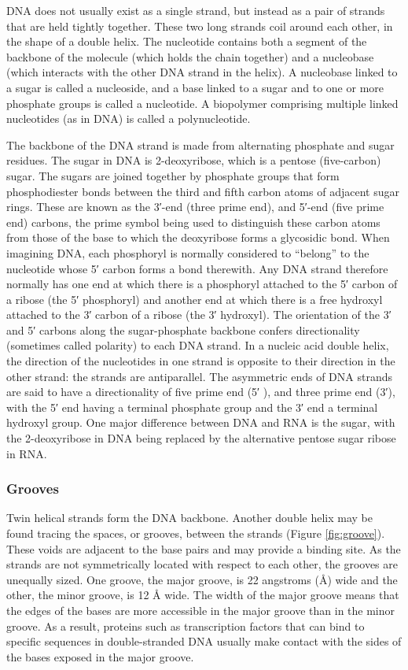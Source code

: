 DNA does not usually exist as a single strand, but instead as a pair of strands that are held tightly together. These two long strands coil around each other, in the shape of a double helix. The nucleotide contains both a segment of the backbone of the molecule (which holds the chain together) and a nucleobase (which interacts with the other DNA strand in the helix). A nucleobase linked to a sugar is called a nucleoside, and a base linked to a sugar and to one or more phosphate groups is called a nucleotide. A biopolymer comprising multiple linked nucleotides (as in DNA) is called a polynucleotide.

The backbone of the DNA strand is made from alternating phosphate and sugar residues. The sugar in DNA is 2-deoxyribose, which is a pentose (five-carbon) sugar. The sugars are joined together by phosphate groups that form phosphodiester bonds between the third and fifth carbon atoms of adjacent sugar rings. These are known as the 3′-end (three prime end), and 5′-end (five prime end) carbons, the prime symbol being used to distinguish these carbon atoms from those of the base to which the deoxyribose forms a glycosidic bond. When imagining DNA, each phosphoryl is normally considered to ``belong'' to the nucleotide whose 5′ carbon forms a bond therewith. Any DNA strand therefore normally has one end at which there is a phosphoryl attached to the 5′ carbon of a ribose (the 5′ phosphoryl) and another end at which there is a free hydroxyl attached to the 3′ carbon of a ribose (the 3′ hydroxyl). The orientation of the 3′ and 5′ carbons along the sugar-phosphate backbone confers directionality (sometimes called polarity) to each DNA strand. In a nucleic acid double helix, the direction of the nucleotides in one strand is opposite to their direction in the other strand: the strands are antiparallel. The asymmetric ends of DNA strands are said to have a directionality of five prime end (5′ ), and three prime end (3′), with the 5′ end having a terminal phosphate group and the 3′ end a terminal hydroxyl group. One major difference between DNA and RNA is the sugar, with the 2-deoxyribose in DNA being replaced by the alternative pentose sugar ribose in RNA.

\hypertarget{grooves}{%
\subsubsection{Grooves}\label{grooves}}

Twin helical strands form the DNA backbone. Another double helix may be found tracing the spaces, or grooves, between the strands (Figure \ref{fig:groove}). These voids are adjacent to the base pairs and may provide a binding site. As the strands are not symmetrically located with respect to each other, the grooves are unequally sized. One groove, the major groove, is 22 angstroms (Å) wide and the other, the minor groove, is 12 Å wide. The width of the major groove means that the edges of the bases are more accessible in the major groove than in the minor groove. As a result, proteins such as transcription factors that can bind to specific sequences in double-stranded DNA usually make contact with the sides of the bases exposed in the major groove.



